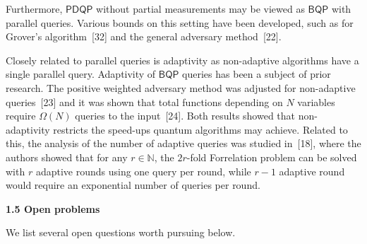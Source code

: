 \documentclass[10pt,a4paper]{article}
\begin{document}
Furthermore, $\mathsf{PDQP}$ without partial measurements may be viewed as $\mathsf{BQP}$ with parallel queries. Various bounds on this setting have been developed, such as for Grover’s algorithm [32] and the general adversary method [22].\par




Closely related to parallel queries is adaptivity as non-adaptive algorithms have a single parallel query. Adaptivity of $\mathsf{BQP}$ queries has been a subject of prior research. The positive weighted adversary method was adjusted for non-adaptive queries [23] and it was shown that total functions depending on $N$ variables require $\Omega(N)$ queries to the input [24]. Both results showed that non-adaptivity restricts the speed-ups quantum algorithms may achieve. Related to this, the analysis of the number of adaptive queries was studied in [18], where the authors showed that for any $r\in\mathbb{N}$, the $2r$-fold Forrelation problem can be solved with $r$ adaptive rounds using one query per round, while $r-1$ adaptive round would require an exponential number of queries per round.\par





\par\medskip\noindent\textbf{
1.5 Open problems}\par




We list several open questions worth pursuing below.\par
\end{document}
